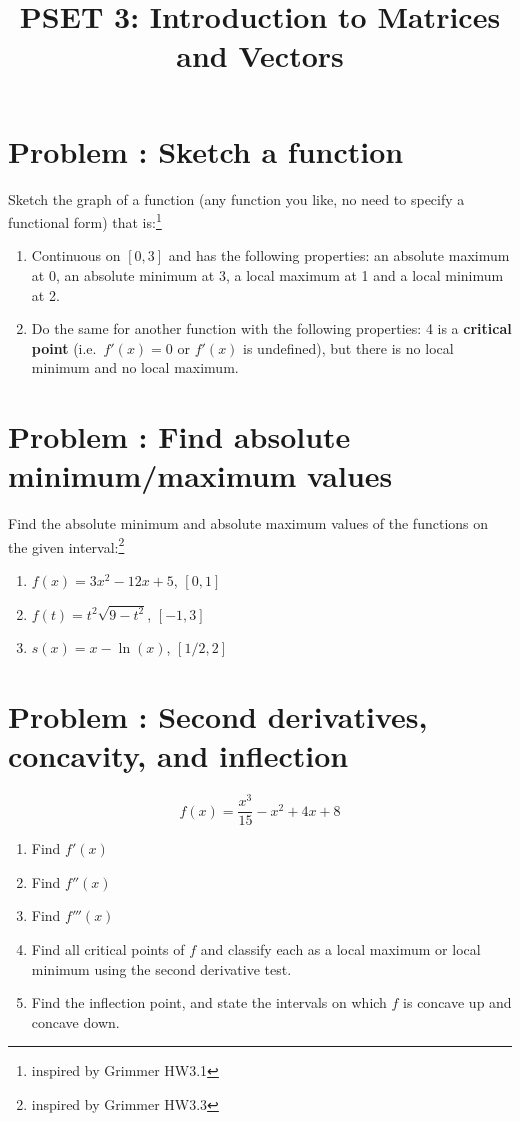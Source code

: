 \documentclass[11pt]{article}
\title{PSET 3: Introduction to Matrices and Vectors}
\author{}
\date{\vspace{-2.5em}}
\newcounter{problem}
\newcommand{\problem}[1]{\stepcounter{problem}\section*{Problem \theproblem: #1}}
\begin{document}
\maketitle



\problem{Sketch a function}

Sketch the graph of a function (any function you like, no need to
specify a functional form) that is:\footnote{inspired by Grimmer HW3.1}

\begin{enumerate}[label=\alph*.]
\item Continuous on \([0,3]\) and has the following properties: an
  absolute maximum at 0, an absolute minimum at 3, a local maximum at 1
  and a local minimum at 2.
\item Do the same for another function with the following properties: 4
  is a \textbf{critical point} (i.e.\ \(f'(x) = 0\) or \(f'(x)\) is
  undefined), but there is no local minimum and no local maximum.
\end{enumerate}

\problem{Find absolute minimum/maximum values}

Find the absolute minimum and absolute maximum values of the functions
on the given interval:\footnote{inspired by Grimmer HW3.3}

\begin{enumerate}[label=\alph*.]
\item \(f(x) = 3x^2 - 12x + 5\), \([0,1]\)
\item \(f(t) = t^2\sqrt{9 - t^2}\), \([-1,3]\)
\item \(s(x) = x - \ln(x)\), \([1/2, 2]\)
\end{enumerate}

\problem{Second derivatives, concavity, and inflection}

\[
f(x) = \frac{x^3}{15} - x^2 + 4x + 8
\]

\begin{enumerate}[label=\alph*.]
\item Find \(f'(x)\)
\item Find \(f''(x)\)
\item Find \(f'''(x)\)
\item Find all critical points of \(f\) and classify each as a local
  maximum or local minimum using the second derivative test.
\item Find the inflection point, and state the intervals on which \(f\)
  is concave up and concave down.
\end{enumerate}
\end{document}
